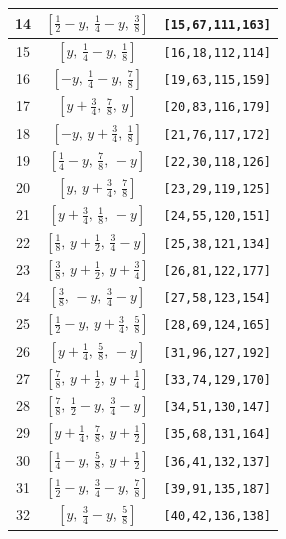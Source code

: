 \documentclass[fleqn,8pt]{jsarticle}
\begin{document}
\begin{longtable}{ccc}
14 & $\left[ \frac{1}{2} - y,\, \frac{1}{4} - y,\, \frac{3}{8} \right]$ & {\tt [15,67,111,163]} \\ \hline
15 & $\left[ y,\, \frac{1}{4} - y,\, \frac{1}{8} \right]$ & {\tt [16,18,112,114]} \\ \hline
16 & $\left[ - y,\, \frac{1}{4} - y,\, \frac{7}{8} \right]$ & {\tt [19,63,115,159]} \\ \hline
17 & $\left[ y + \frac{3}{4},\, \frac{7}{8},\, y \right]$ & {\tt [20,83,116,179]} \\ \hline
18 & $\left[ - y,\, y + \frac{3}{4},\, \frac{1}{8} \right]$ & {\tt [21,76,117,172]} \\ \hline
19 & $\left[ \frac{1}{4} - y,\, \frac{7}{8},\, - y \right]$ & {\tt [22,30,118,126]} \\ \hline
20 & $\left[ y,\, y + \frac{3}{4},\, \frac{7}{8} \right]$ & {\tt [23,29,119,125]} \\ \hline
21 & $\left[ y + \frac{3}{4},\, \frac{1}{8},\, - y \right]$ & {\tt [24,55,120,151]} \\ \hline
22 & $\left[ \frac{1}{8},\, y + \frac{1}{2},\, \frac{3}{4} - y \right]$ & {\tt [25,38,121,134]} \\ \hline
23 & $\left[ \frac{3}{8},\, y + \frac{1}{2},\, y + \frac{3}{4} \right]$ & {\tt [26,81,122,177]} \\ \hline
24 & $\left[ \frac{3}{8},\, - y,\, \frac{3}{4} - y \right]$ & {\tt [27,58,123,154]} \\ \hline
25 & $\left[ \frac{1}{2} - y,\, y + \frac{3}{4},\, \frac{5}{8} \right]$ & {\tt [28,69,124,165]} \\ \hline
26 & $\left[ y + \frac{1}{4},\, \frac{5}{8},\, - y \right]$ & {\tt [31,96,127,192]} \\ \hline
27 & $\left[ \frac{7}{8},\, y + \frac{1}{2},\, y + \frac{1}{4} \right]$ & {\tt [33,74,129,170]} \\ \hline
28 & $\left[ \frac{7}{8},\, \frac{1}{2} - y,\, \frac{3}{4} - y \right]$ & {\tt [34,51,130,147]} \\ \hline
29 & $\left[ y + \frac{1}{4},\, \frac{7}{8},\, y + \frac{1}{2} \right]$ & {\tt [35,68,131,164]} \\ \hline
30 & $\left[ \frac{1}{4} - y,\, \frac{5}{8},\, y + \frac{1}{2} \right]$ & {\tt [36,41,132,137]} \\ \hline
31 & $\left[ \frac{1}{2} - y,\, \frac{3}{4} - y,\, \frac{7}{8} \right]$ & {\tt [39,91,135,187]} \\ \hline
32 & $\left[ y,\, \frac{3}{4} - y,\, \frac{5}{8} \right]$ & {\tt [40,42,136,138]} \\ \hline

\end{longtable}
\end{document}
